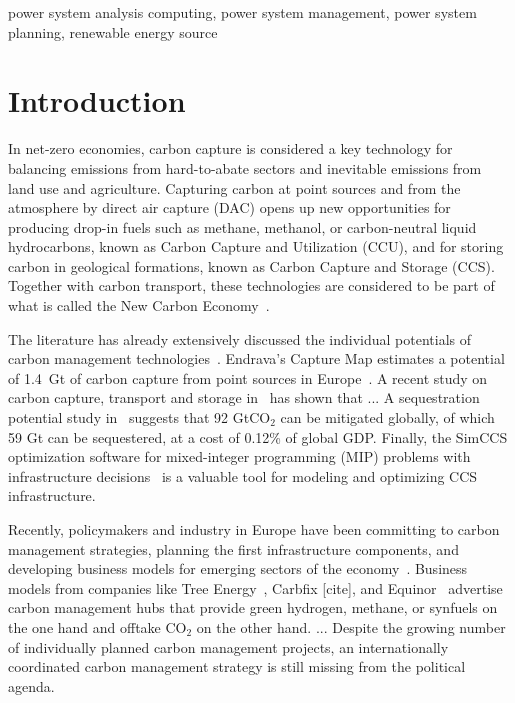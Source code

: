 \documentclass[conference]{IEEEtran}
\begin{document}
\begin{IEEEkeywords}
    power system analysis computing, power system management, power system planning, renewable energy source
\end{IEEEkeywords}


\section{Introduction}
\label{sec:introduction}

In net-zero economies, carbon capture is considered a key technology for balancing emissions from hard-to-abate sectors and inevitable emissions from land use and agriculture. Capturing carbon at point sources and from the atmosphere by direct air capture (DAC) opens up new opportunities for producing drop-in fuels such as methane, methanol, or carbon-neutral liquid hydrocarbons, known as Carbon Capture and Utilization (CCU), and for storing carbon in geological formations, known as Carbon Capture and Storage (CCS). Together with carbon transport, these technologies are considered to be part of what is called the New Carbon Economy~\cite{arniehellerNewCarbonEconomy2019}.

The literature has already extensively discussed the individual potentials of carbon management technologies~\cite{burandtDecarbonizingChinaEnergy2019,caprosEnergysystemModellingEU2019,damoreOptimalDesignEuropean2021,larsonNetZeroAmericaPotential2021,maModelingOptimizationCombined2021,mikulcicFlexibleCarbonCapture2019,williamsCarbonNeutralPathwaysUnited2021}.
Endrava's Capture Map estimates a potential of 1.4~Gt of carbon capture from point sources in Europe~\cite{ToolsGreenTransition}.
A recent study on carbon capture, transport and storage in~\cite{CaptureMapGetSitespecific} has shown that ...
A sequestration potential study in~\cite{weiProposedGlobalLayout2021} suggests that 92 GtCO$_2$ can be mitigated globally, of which 59 Gt can be sequestered, at a cost of 0.12\% of global GDP.
Finally, the SimCCS optimization software for mixed-integer programming (MIP) problems with infrastructure decisions~\cite{middletonSimCCSOpensourceTool2020} is a valuable tool for modeling and optimizing CCS infrastructure.


Recently, policymakers and industry in Europe have been committing to carbon management strategies, planning the first infrastructure components, and developing business models for emerging sectors of the economy~\cite{adomaitisEquinorRWEBuild2023,apnewswireGermanyDrawLegislation2023,KohlenstoffKannKlimaschutz2023,OGETESJoin2022,TESHydrogenLife2023}. Business models from companies like Tree Energy~\cite{TESHydrogenLife2023}, Carbfix [cite], and Equinor~\cite{adomaitisEquinorRWEBuild2023} advertise carbon management hubs that provide green hydrogen, methane, or synfuels on the one hand and offtake CO$_2$ on the other hand. ...
Despite the growing number of individually planned carbon management projects, an internationally coordinated carbon management strategy is still missing from the political agenda.
\end{document}

